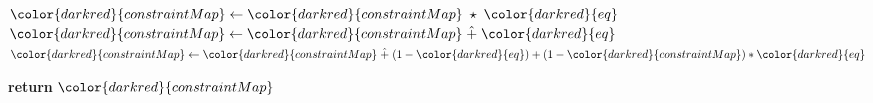 \begin{algorithm}[H]
\begin{algorithmic}[1]
            \State ${\color{darkred}{constraintMap}} \gets {\color{darkred}{constraintMap}} \hmul {\color{darkred}{eq}}$ 
            \State ${\color{darkred}{constraintMap}} \gets {\color{darkred}{constraintMap}} \hplus {\color{darkred}{eq}}$
            \State ${\color{darkred}{constraintMap}} \gets {\color{darkred}{constraintMap}} \hplus (1-{\color{darkred}{eq}}) + (1-{\color{darkred}{constraintMap}}) * {\color{darkred}{eq}}$
        \EndIf

    \EndFor

    \State \textbf{return} {${\color{darkred}{constraintMap}}$}
\EndProcedure

\end{algorithmic}
\end{algorithm}

